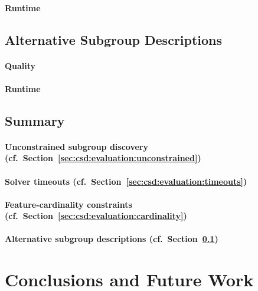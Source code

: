 \documentclass{article}
\theoremstyle{definition}
\begin{document}
\paragraph{Runtime}

\subsection{Alternative Subgroup Descriptions}
\label{sec:csd:evaluation:alternatives}

\paragraph{Quality}

\paragraph{Runtime}

\subsection{Summary}
\label{sec:csd:evaluation:summary}

\paragraph{Unconstrained subgroup discovery (cf.~Section~\ref{sec:csd:evaluation:unconstrained})}

\paragraph{Solver timeouts (cf.~Section~\ref{sec:csd:evaluation:timeouts})}

\paragraph{Feature-cardinality constraints (cf.~Section~\ref{sec:csd:evaluation:cardinality})}

\paragraph{Alternative subgroup descriptions (cf.~Section~\ref{sec:csd:evaluation:alternatives})}

\section{Conclusions and Future Work}
\label{sec:csd:conclusion}
\end{document}

